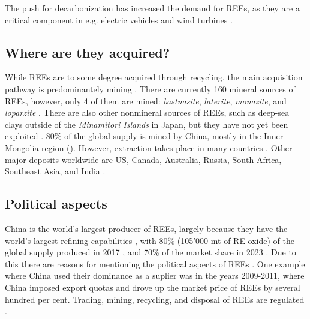 The push for decarbonization has increased the demand for REEs, as they are a critical component in e.g. electric vehicles and wind turbines \cite{windturbines2022}.

\subsection{Where are they acquired?}

While REEs are to some degree acquired through recycling, the main acquisition pathway is predominantely mining \cite{britannica2024}\cite{REELandscape}. There are currently 160 mineral sources of REEs, however, only 4 of them are mined: \textit{bastnasite}, \textit{laterite}, \textit{monazite}, and \textit{loparzite} \cite{britannica2024}. There are also other nonmineral sources of REEs, such as deep-sea clays outside of the \textit{Minamitori Islands} in Japan, but they have not yet been exploited \cite{britannica2024}. 80\% of the global supply is mined by China, mostly in the Inner Mongolia region (\cite{britannica2024}). However, extraction takes place in many countries \cite{britannica2024}. Other major deposits worldwide are US, Canada, Australia, Russia, South Africa, Southeast Asia, and India \cite{britannica2024}.

\subsection{Political aspects}

China is the world's largest producer of REEs, largely because they have the world's largest refining capabilities \cite{ChinaRefining}, with 80\% (105'000 mt of RE oxide) of the global supply produced in 2017 \cite{britannica2024}, and 70\% of the market share in 2023 \cite{ChinaRefining}. Due to this there are reasons for mentioning the political aspects of REEs \cite{britannica2024}. One example where China used their dominance as a suplier was in the years 2009-2011, where China imposed export quotas and drove up the market price of REEs by several hundred per cent\cite{britannica2024}. Trading, mining, recycling, and disposal of REEs are regulated \cite{REELandscape}.